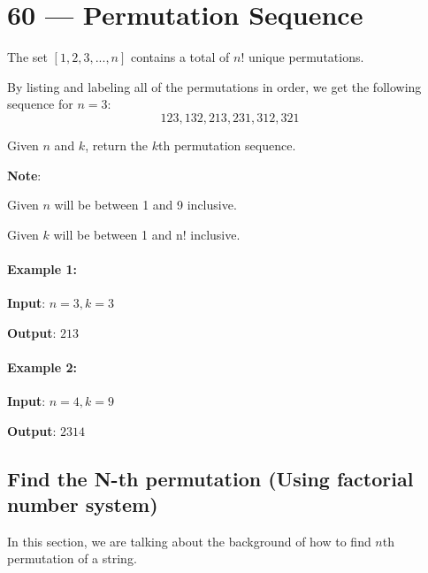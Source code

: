 \section{60 --- Permutation Sequence}
The set $[1,2,3,...,n]$ contains a total of $n!$ unique permutations.
\par
By listing and labeling all of the permutations in order, we get the following sequence for $n = 3$:
\[
123, 132, 213, 231, 312, 321
\]
\par
Given $n$ and $k$, return the $k$th permutation sequence.
\par
\textbf{Note}:
\par
Given $n$ will be between 1 and 9 inclusive.
\par
Given $k$ will be between 1 and n! inclusive.
\paragraph{Example 1:}
\begin{flushleft}
\textbf{Input}: $n = 3, k = 3$
\par
\textbf{Output}: $213$
\end{flushleft}
\paragraph{Example 2:}
\begin{flushleft}
\textbf{Input}: $n = 4, k = 9$
\par
\textbf{Output}: $2314$
\end{flushleft}
\subsection{Find the N-th permutation (Using factorial number system)} 
In this section, we are talking about the background of how to find $n$th permutation of a string. 
